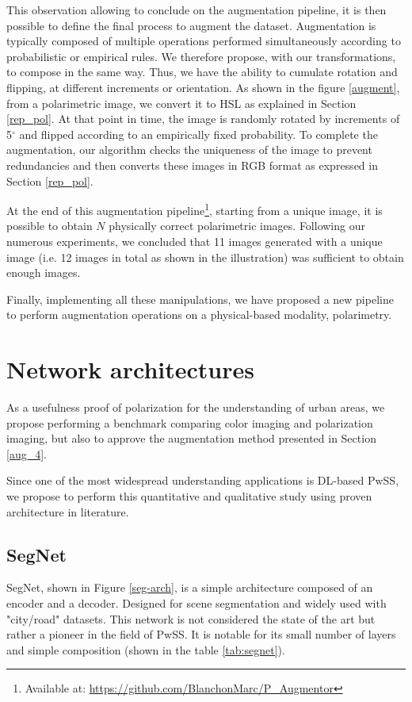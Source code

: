 This observation allowing to conclude on the augmentation pipeline, it is then possible to define the final process to augment the dataset.
Augmentation is typically composed of multiple operations performed simultaneously according to probabilistic or empirical rules. 
We therefore propose, with our transformations, to compose in the same way. Thus, we have the ability to cumulate rotation and flipping, at different increments or orientation.
As shown in the figure \ref{augment}, from a polarimetric image, we convert it to HSL as explained in Section \ref{rep_pol}. At that point in time, the image is randomly rotated by increments of 5$^\circ$ and flipped according to an empirically fixed probability. To complete the augmentation, our algorithm checks the uniqueness of the image to prevent redundancies and then converts these images in RGB format as expressed in Section \ref{rep_pol}.


At the end of this augmentation pipeline\footnote{Available at: \url{https://github.com/BlanchonMarc/P_Augmentor}}, starting from a unique image, it is possible to obtain $N$ physically correct polarimetric images. Following our numerous experiments, we concluded that 11 images generated with a unique image (i.e. 12 images in total as shown in the illustration) was sufficient to obtain enough images. 


Finally, implementing all these manipulations, we have proposed a new pipeline to perform augmentation operations on a physical-based modality, polarimetry.


\section{Network architectures}\label{net_4}

As a usefulness proof of polarization for the understanding of urban areas, we propose performing a benchmark comparing color imaging and polarization imaging, but also to approve the augmentation method presented in Section \ref{aug_4}.

Since one of the most widespread understanding applications is DL-based PwSS, we propose to perform this quantitative and qualitative study using proven architecture in literature.

\subsection{SegNet}\label{segnet_sec}

SegNet\cite{DBLP:journals/corr/BadrinarayananH15}, shown in Figure \ref{seg-arch}, is a simple architecture composed of an encoder and a decoder. Designed for scene segmentation and widely used with "city/road" datasets.  This network is not considered the state of the art but rather a pioneer in the field of PwSS.  It is notable for its small number of layers and simple composition (shown in the table \ref{tab:segnet}). 

